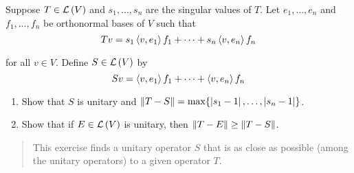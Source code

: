 \begin{exercise}
    Suppose $T\in\mathcal{L}\left({V}\right)$ and $s_{1}, \ldots, s_{n}$ are the singular values of $T$. Let $e_{1}, \ldots, e_{n}$ and $f_{1}, \ldots, f_{n}$ be orthonormal bases of $V$ such that
    \[
        Tv = s_{1}\left\langle{v, e_{1}}\right\rangle f_{1} + \cdots + s_{n}\left\langle{v, e_{n}}\right\rangle f_{n}
    \]

    for all $v\in V$. Define $S\in \mathcal{L}\left({V}\right)$ by
    \[
        Sv = \left\langle{v, e_{1}}\right\rangle f_{1} + \cdots + \left\langle{v, e_{n}}\right\rangle f_{n}
    \]

    \begin{enumerate}[label={(\alph*)}]
        \item Show that $S$ is unitary and $\left\Vert{T - S}\right\Vert = \max\{ \left\vert{s_{1} - 1}\right\vert, \ldots, \left\vert{s_{n} - 1}\right\vert \}$.
        \item Show that if $E\in\mathcal{L}\left({V}\right)$ is unitary, then $\left\Vert{T - E}\right\Vert\geq \left\Vert{T - S}\right\Vert$.
    \end{enumerate}
\end{exercise}

\begin{quote}
    This exercise finds a unitary operator $S$ that is as close as possible (among the unitary operators) to a given operator $T$.
\end{quote}


